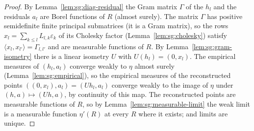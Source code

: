 \begin{proof}
  \leanok
{}
By Lemma~\ref{lem:sg:diag-residual} the Gram matrix $\Gamma$ of the $h_l$ and the residuals $a_l$ are Borel functions of $R$ (almost surely). The matrix $\Gamma$ has positive semidefinite finite principal submatrices (it is a Gram matrix), so the rows $x_l=\sum_{k\le l}L_{l,k}\varepsilon_k$ of its Cholesky factor (Lemma~\ref{lem:sg:cholesky}) satisfy $\langle x_l,x_{l'}\rangle=\Gamma_{l,l'}$ and are measurable functions of $R$. By Lemma~\ref{lem:sg:gram-isometry} there is a linear isometry $U$ with $U(h_l)=(0,x_l)$. The empirical measures of $(h_l,a_l)$ converge weakly to $\eta$ almost surely (Lemma~\ref{lem:sg:empirical}), so the empirical measures of the reconstructed points $((0,x_l),a_l)=(U h_l,a_l)$ converge weakly to the image of $\eta$ under $(h,a)\mapsto(Uh,a)$, by continuity of this map. The reconstructed points are measurable functions of $R$, so by Lemma~\ref{lem:sg:measurable-limit} the weak limit is a measurable function $\eta'(R)$ at every $R$ where it exists; and limits are unique.
\end{proof}

